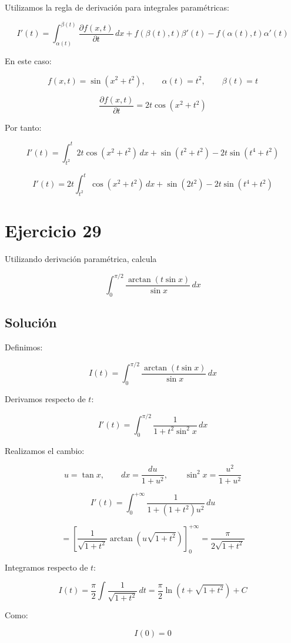 \documentclass[fleqn]{article}
\begin{document}
	Utilizamos la regla de derivación para integrales paramétricas:

	\[
	I'(t)
	=
	\int_{\alpha(t)}^{\beta(t)}
	\frac{\partial f(x,t)}{\partial t}\,dx
	+
	f(\beta(t),t)\beta'(t)
	-
	f(\alpha(t),t)\alpha'(t)
	\]

	En este caso:

	\[
	f(x,t)=\sin(x^2+t^2),
	\qquad
	\alpha(t)=t^2,
	\qquad
	\beta(t)=t
	\]

	\[
	\frac{\partial f(x,t)}{\partial t}
	=
	2t\cos(x^2+t^2)
	\]

	Por tanto:

	\[
	I'(t)
	=
	\int_{t^2}^{t}2t\cos(x^2+t^2)\,dx
	+
	\sin(t^2+t^2)
	-
	2t\sin(t^4+t^2)
	\]

	\[
	\boxed{
	I'(t)
	=
	2t\int_{t^2}^{t}\cos(x^2+t^2)\,dx
	+
	\sin(2t^2)
	-
	2t\sin(t^4+t^2)
	}
	\]

\section{Ejercicio 29}
	Utilizando derivación paramétrica, calcula

	\[
	\int_0^{\pi/2}
	\frac{\arctan(t\sin x)}{\sin x}\,dx
	\]

	\subsection{Solución}

	Definimos:

	\[
	I(t)
	=
	\int_0^{\pi/2}
	\frac{\arctan(t\sin x)}{\sin x}\,dx
	\]

	Derivamos respecto de $t$:

	\[
	I'(t)
	=
	\int_0^{\pi/2}
	\frac{1}{1+t^2\sin^2 x}\,dx
	\]

	Realizamos el cambio:

	\[
	u=\tan x,
	\qquad
	dx=\frac{du}{1+u^2},
	\qquad
	\sin^2 x=\frac{u^2}{1+u^2}
	\]

	\[
	I'(t)
	=
	\int_0^{+\infty}
	\frac{1}{1+(1+t^2)u^2}\,du
	\]

	\[
	=
	\left[
	\frac{1}{\sqrt{1+t^2}}
	\arctan\left(u\sqrt{1+t^2}\right)
	\right]_0^{+\infty}
	=
	\frac{\pi}{2\sqrt{1+t^2}}
	\]

	Integramos respecto de $t$:

	\[
	I(t)
	=
	\frac{\pi}{2}
	\int\frac{1}{\sqrt{1+t^2}}\,dt
	=
	\frac{\pi}{2}
	\ln\left(t+\sqrt{1+t^2}\right)+C
	\]

	Como:

	\[
	I(0)=0
	\]
\end{document}
